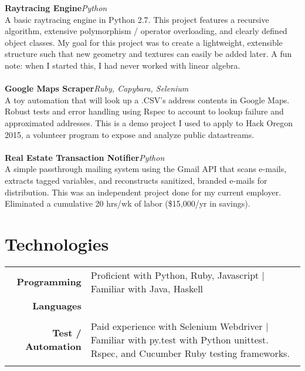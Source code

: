 \documentclass[11pt,line,centered]{res}
\begin{document}
\begin{resume}
    \footnotesize{\bfseries Raytracing Engine}\hfill \textit {Python}\\
        A basic raytracing engine in Python 2.7. This project features a recursive algorithm, extensive polymorphism
        / operator overloading, and clearly defined object classes. My goal for this project was to create a lightweight,
        extensible structure such that new geometry and textures can easily be added later. A fun note: when I
        started this, I had never worked with linear algebra.\\
    \\
    \footnotesize {\bfseries Google Maps Scraper}\hfill \textit {Ruby, Capybara, Selenium}\\
        A toy automation that will look up a .CSV’s address contents in Google Maps. Robust tests and error
        handling using Rspec to account to lookup failure and approximated addresses. This is a demo project I
        used to apply to Hack Oregon 2015, a volunteer program to expose and analyze public datastreams.\\
    \\
    \footnotesize{\bfseries  Real Estate Transaction Notifier}\hfill \textit {Python}\\
        A simple passthrough mailing system using the Gmail API that scans e-mails, extracts tagged variables,
        and reconstructs sanitized, branded e-mails for distribution. This was an independent project done for my
        current employer. Eliminated a cumulative 20 hrs/wk of labor (\$15,000/yr in savings).\\

\section{\sectionfont\normalsize Technologies}
        \vspace{1em}

    \begin{tabulary}{\textwidth}{rJ}
        \footnotesize{\bfseries Programming} & Proficient with Python, Ruby, Javascript | Familiar with Java, Haskell\\
        \footnotesize{\bfseries Languages}\\
        \\

        \footnotesize{\bfseries Test / Automation} & Paid experience with Selenium Webdriver | Familiar with py.test with Python unittest. Rspec, and Cucumber Ruby testing frameworks.\\
        \\


\end{tabulary}
\end{resume}
\end{document}
